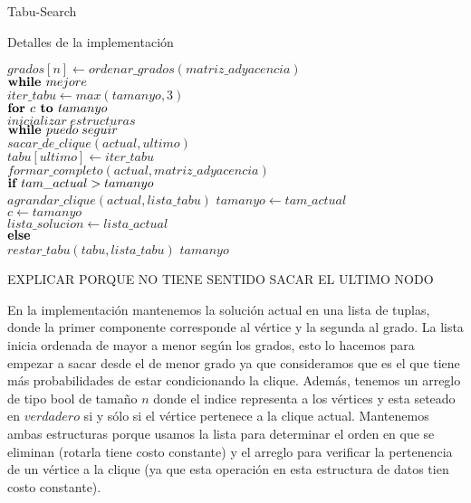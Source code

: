 \begin{section}{Tabu-Search}
\begin{subsection}{Detalles de la implementación}
			\begin{pseudo}
				\tab $grados[n] \leftarrow ordenar\_grados(matriz\_adyacencia)$\\
				\tab $\textbf{while } mejore$\\
				\tab \tab $iter\_tabu \leftarrow max(tamanyo,3)$\\
				\tab \tab $\textbf{for } c \textbf{ to } tamanyo$\\
				\tab \tab \tab $inicializar\;estructuras$\\
				\tab \tab \tab $\textbf{while } puedo\;seguir$\\
				\tab \tab \tab \tab $sacar\_de\_clique(actual,ultimo)$\\
				\tab \tab \tab \tab $tabu[ultimo] \leftarrow iter\_tabu$\\
				\tab \tab \tab \tab $formar\_completo(actual,matriz\_adyacencia)$\\
				\tab \tab \tab \tab $\textbf{if } tam\_actual>tamanyo$\\
				\tab \tab \tab \tab \tab $agrandar\_clique(actual,lista\_tabu)$
				\tab \tab \tab \tab \tab $tamanyo \leftarrow tam\_actual$\\
				\tab \tab \tab \tab \tab $c \leftarrow tamanyo$\\
				\tab \tab \tab \tab \tab $lista\_solucion \leftarrow lista\_actual$\\
				\tab \tab \tab \tab $\textbf{else }$\\
				\tab \tab \tab \tab \tab $restar\_tabu(tabu,lista\_tabu)$
				\RET $tamanyo$\\
			\end{pseudo}

		EXPLICAR PORQUE NO TIENE SENTIDO SACAR EL ULTIMO NODO

		En la implementación mantenemos la solución actual en una lista de tuplas, donde la primer componente corresponde al vértice y la segunda al grado. La lista inicia ordenada de mayor a menor según los grados, esto lo hacemos para empezar a sacar desde el de menor grado ya que consideramos que es el que tiene más probabilidades de estar condicionando la clique. Además, tenemos un arreglo de tipo bool de tamaño $n$ donde el indice representa a los vértices y esta seteado en $verdadero$ si y sólo si el vértice pertenece a la clique actual. Mantenemos ambas estructuras porque usamos la lista para determinar el orden en que se eliminan (rotarla tiene costo constante) y el arreglo para verificar la pertenencia de un vértice a la clique (ya que esta operación en esta estructura de datos tien costo constante).


\end{subsection}
\end{section}
